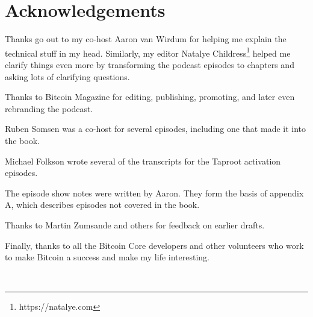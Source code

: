 \chapter{Acknowledgements}

Thanks go out to my co-host Aaron van Wirdum for helping me explain the technical stuff in my head. Similarly, my editor Natalye Childress\footnote{https://natalye.com  } helped me clarify things even more by transforming the podcast episodes to chapters and asking lots of clarifying questions.

Thanks to Bitcoin Magazine for editing, publishing, promoting, and later even rebranding the podcast.

Ruben Somsen was a co-host for several episodes, including one that made it into the book.

Michael Folkson wrote several of the transcripts for the Taproot activation episodes.

The episode show notes were written by Aaron. They form the basis of appendix A, which describes episodes not covered in the book.

Thanks to Martin Zumsande and others for feedback on earlier drafts.

Finally, thanks to all the Bitcoin Core developers and other volunteers who work to make Bitcoin a success and make my life interesting.

\newpage

\ %

\newpage
